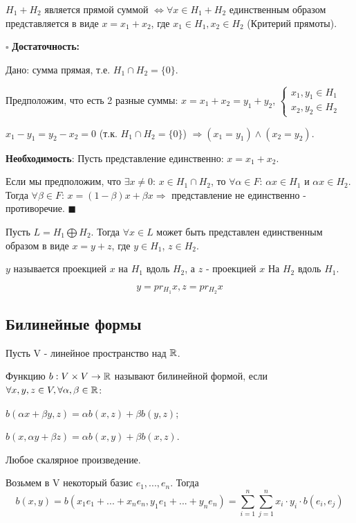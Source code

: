\documentclass[../main.tex]{subfiles}
\begin{document}
\void{} $H_1 + H_2$ является прямой суммой $\Longleftrightarrow \forall x\in H_1+H_2$
единственным образом представляется в виде $x = x_1+x_2$, где $x_1\in H_1, x_2\in H_2$ (Критерий прямоты).

\void $\square$ \textbf{Достаточность:}

Дано: сумма прямая, т.е. $H_1\cap H_2 = \{0\}$.

Предположим, что есть 2 разные суммы: $x = x_1+x_2 = y_1+y_2$, $\left\{ \begin{matrix}x_1,y_1\in H_1\\ x_2,y_2\in H_2\end{matrix}\right.$

$x_1 - y_1 = y_2 - x_2 = 0$ (т.к. $H_1\cap H_2 = \{0\}$) $\Longrightarrow (x_1 = y_1) \wedge (x_2 = y_2)$.

\textbf{Необходимость}: Пусть представление единственно: $x = x_1+x_2$.

Если мы предположим, что $\exists x\neq 0$: $x\in H_1\cap H_2$, то
$\forall\alpha\in F$: $\alpha x\in H_1$ и $\alpha x\in H_2$. Тогда
$\forall\beta\in F$: $x = (1-\beta)x + \beta x \Longrightarrow$ представление не единственно - противоречие.
$\blacksquare$

\void
Пусть $L = H_1\bigoplus H_2$. Тогда $\forall x\in L$ может быть представлен единственным образом в виде
$x = y + z$, где $y\in H_1$, $z\in H_2$. 

\void{} $y$ называется проекцией $x$ на $H_1$ вдоль $H_2$, а $z$ - проекцией $x$ На
$H_2$ вдоль $H_1$.

$$y = pr_{H_1}x, z = pr_{H_2}x$$

\subsection{Билинейные формы}

Пусть V - линейное пространство над $\mathbb{R}$.

\void{} Функцию $b: V\times V \rightarrow \mathbb{R}$ называют билинейной формой, если $\forall x,y,z\in V, \forall\alpha,\beta\in\mathbb{R}$:

\void{} $b(\alpha x + \beta y, z) = \alpha b(x, z) + \beta b(y, z)$;

\void{} $b(x, \alpha y + \beta z) = \alpha b(x, y) + \beta b(x, z)$.

\void{} Любое скалярное произведение.

\void
Возьмем в V некоторый базис $e_1,...,e_n$. Тогда 
$$b(x,y) = b(x_1e_1 + ... + x_n e_n, y_1e_1 + ... + y_n e_n) = \sum_{i=1}^n\sum_{j=1}^n x_i\cdot y_i\cdot b(e_i,e_j)$$
\end{document}
